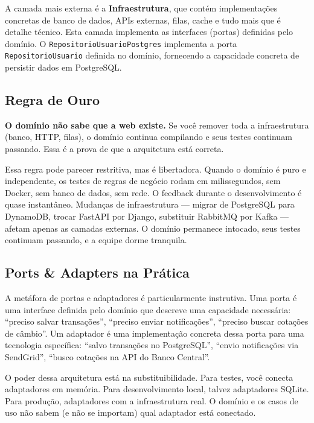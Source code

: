 A camada mais externa é a \textbf{Infraestrutura}, que contém implementações
concretas de banco de dados, APIs externas, filas, cache e tudo mais que é
detalhe técnico. Esta camada implementa as interfaces (portas) definidas pelo
domínio. O \texttt{RepositorioUsuarioPostgres} implementa a porta
\texttt{RepositorioUsuario} definida no domínio, fornecendo a capacidade
concreta de persistir dados em PostgreSQL.

\subsection{Regra de Ouro}

\textbf{O domínio não sabe que a web existe.} Se você remover toda a infraestrutura
(banco, HTTP, filas), o domínio continua compilando e seus testes continuam passando.
Essa é a prova de que a arquitetura está correta.

Essa regra pode parecer restritiva, mas é libertadora. Quando o
domínio é puro e independente, os testes de regras de negócio rodam em
milissegundos, sem Docker, sem banco de dados, sem rede. O feedback durante o
desenvolvimento é quase instantâneo. Mudanças de infraestrutura --- migrar de
PostgreSQL para DynamoDB, trocar FastAPI por Django, substituir RabbitMQ por
Kafka --- afetam apenas as camadas externas. O domínio permanece intocado,
seus testes continuam passando, e a equipe dorme tranquila.

\subsection{Ports \& Adapters na Prática}

A metáfora de portas e adaptadores é particularmente instrutiva. Uma porta é
uma interface definida pelo domínio que descreve uma capacidade necessária:
``preciso salvar transações'', ``preciso enviar notificações'', ``preciso
buscar cotações de câmbio''. Um adaptador é uma implementação concreta dessa
porta para uma tecnologia específica: ``salvo transações no PostgreSQL'',
``envio notificações via SendGrid'', ``busco cotações na API do Banco Central''.

O poder dessa arquitetura está na substituibilidade. Para testes, você conecta
adaptadores em memória. Para desenvolvimento local, talvez adaptadores SQLite.
Para produção, adaptadores com a infraestrutura real. O domínio e os casos de
uso não sabem (e não se importam) qual adaptador está conectado.

